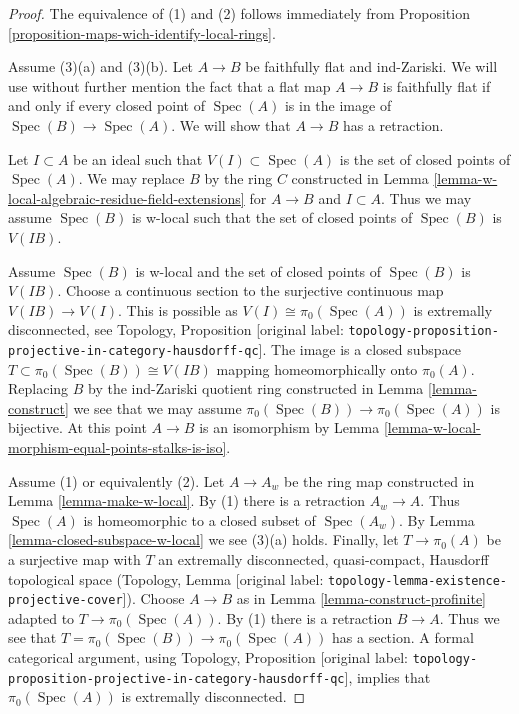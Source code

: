 \documentclass[10pt,a4paper]{article}
\theoremstyle{plain}
\theoremstyle{definition}
\theoremstyle{remark}
\numberwithin{equation}{subsection}
\def\Spec{\mathop{\mathrm{Spec}}}
\begin{document}
\begin{proof}
The equivalence of (1) and (2) follows immediately from
Proposition \ref{proposition-maps-wich-identify-local-rings}.

\medskip\noindent
Assume (3)(a) and (3)(b). Let $A \to B$ be faithfully flat and ind-Zariski.
We will use without further mention the fact that a flat map
$A \to B$ is faithfully flat if and only if every closed point
of $\Spec(A)$ is in the image of $\Spec(B) \to \Spec(A)$.
We will show that $A \to B$ has a retraction.

\medskip\noindent
Let $I \subset A$ be an ideal such that $V(I) \subset \Spec(A)$ is
the set of closed points of $\Spec(A)$. 
We may replace $B$ by the ring $C$ constructed in
Lemma \ref{lemma-w-local-algebraic-residue-field-extensions}
for $A \to B$ and $I \subset A$.
Thus we may assume $\Spec(B)$ is w-local such that the set of
closed points of $\Spec(B)$ is $V(IB)$.

\medskip\noindent
Assume $\Spec(B)$ is w-local and the set of closed points of $\Spec(B)$
is $V(IB)$. Choose a continuous section to the surjective
continuous map $V(IB) \to V(I)$. This is possible as
$V(I) \cong \pi_0(\Spec(A))$ is extremally disconnected, see
Topology, Proposition
\textnormal{[original label: \nolinkurl{topology-proposition-projective-in-category-hausdorff-qc}]}.
The image is a closed subspace $T \subset \pi_0(\Spec(B)) \cong V(IB)$
mapping homeomorphically onto $\pi_0(A)$. Replacing $B$ by the ind-Zariski
quotient ring constructed in Lemma \ref{lemma-construct}
we see that we may assume $\pi_0(\Spec(B)) \to \pi_0(\Spec(A))$
is bijective. At this point $A \to B$ is an isomorphism by
Lemma \ref{lemma-w-local-morphism-equal-points-stalks-is-iso}.

\medskip\noindent
Assume (1) or equivalently (2). Let $A \to A_w$ be the ring map constructed in
Lemma \ref{lemma-make-w-local}. By (1) there is a retraction $A_w \to A$.
Thus $\Spec(A)$ is homeomorphic to a closed subset of $\Spec(A_w)$. By
Lemma \ref{lemma-closed-subspace-w-local} we see (3)(a) holds.
Finally, let $T \to \pi_0(A)$ be a surjective map with $T$ an
extremally disconnected, quasi-compact, Hausdorff topological space
(Topology, Lemma \textnormal{[original label: \nolinkurl{topology-lemma-existence-projective-cover}]}).
Choose $A \to B$ as in Lemma \ref{lemma-construct-profinite}
adapted to $T \to \pi_0(\Spec(A))$. By (1) there is a retraction
$B \to A$. Thus we see that $T = \pi_0(\Spec(B)) \to \pi_0(\Spec(A))$
has a section. A formal categorical argument, using
Topology, Proposition
\textnormal{[original label: \nolinkurl{topology-proposition-projective-in-category-hausdorff-qc}]},
implies that $\pi_0(\Spec(A))$ is extremally disconnected.
\end{proof}
\end{document}

